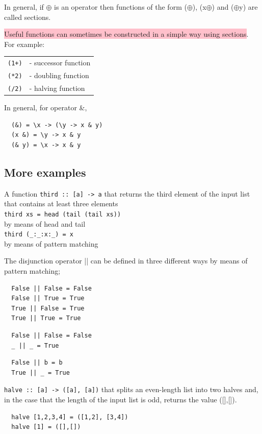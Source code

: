 \documentclass[tikz,border=10pt]{project_plan}
\begin{document}
In general, if $\oplus$ is an operator then functions of the form
($\oplus$), (x$\oplus$) and ($\oplus$y) are called sections.

\colorbox{pink}{Useful functions can sometimes be constructed in a simple
  way using sections}. \\For example:\\
\begin{tabular}{l l}
  \lstinline{(1+)} & - successor function \\
  \lstinline{(*2)} & - doubling function  \\
  \lstinline{(/2)} & - halving function   \\
\end{tabular}

In general, for operator \&,
\begin{lstlisting}
  (&) = \x -> (\y -> x & y)
  (x &) = \y -> x & y
  (& y) = \x -> x & y
\end{lstlisting}


\subsection{More examples}

A function \lstinline{third :: [a] -> a} that returns the third element of the
input list that contains at least three elements\\
\lstinline|third xs = head (tail (tail xs))|\\
by means of head and tail\\
\lstinline|third (_:_:x:_) = x|\\
by means of pattern matching

The disjunction operator || can be defined in three
different ways by means of pattern matching;
\begin{lstlisting}
  False || False = False
  False || True = True
  True || False = True
  True || True = True
\end{lstlisting}
\begin{lstlisting}
  False || False = False
  _ || _ = True
\end{lstlisting}
\begin{lstlisting}
  False || b = b
  True || _ = True
\end{lstlisting}

\lstinline|halve :: [a] -> ([a], [a])|
that splits an even-length list into two halves
and, in the case that the length of the input
list is odd, returns the value ([],[]).
\begin{lstlisting}
  halve [1,2,3,4] = ([1,2], [3,4])
  halve [1] = ([],[])
\end{lstlisting}
\end{document}

